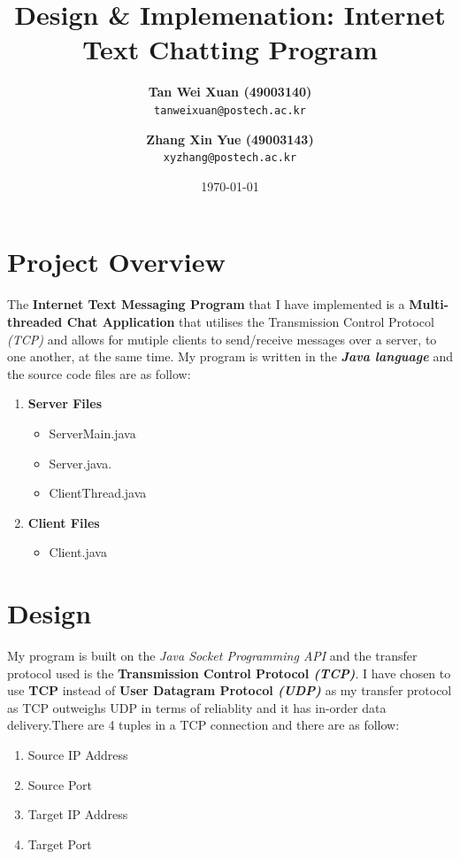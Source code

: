 \documentclass[a4paper,11pt]{article}
\begin{document}
\title{\vspace{-1.0cm}\textbf{Design \& Implemenation: \linebreak Internet Text Chatting Program}}
\author{
  \textbf{Tan Wei Xuan (49003140)}\\
  \texttt{tanweixuan@postech.ac.kr}
  \and
   \textbf{Zhang Xin Yue (49003143)}\\
  \texttt{xyzhang@postech.ac.kr}
}
\date{\today}
\maketitle

\section{Project Overview}
The\textbf{ Internet Text Messaging Program} that I have implemented is a \textbf{Multi-threaded Chat Application} that utilises the Transmission Control Protocol \textit{(TCP)} and allows for mutiple clients to send/receive messages over a server, to one another, at the same time. My program is written in the \textit{\textbf{Java language}} and the source code files are as follow:
\begin{enumerate}
	\item \textbf{Server Files}
\begin{itemize}
  	\item ServerMain.java
 	\item Server.java.
 	\item ClientThread.java
\end{itemize}
	\item \textbf{Client Files}
\begin{itemize}
  	\item Client.java
\end{itemize}
\end{enumerate}

\section{Design}
My program is built on the  \textit{Java Socket Programming API} and the transfer protocol used is the \textbf{Transmission Control Protocol \textit{(TCP)}}.
I have chosen to use \textbf{TCP} instead of \textbf{User Datagram Protocol \textit{(UDP)}} as my transfer protocol as TCP outweighs UDP in terms of reliablity and it has in-order data delivery.There are 4 tuples in a TCP connection and there are as follow:
\begin{enumerate}
  \item Source IP Address
  \item Source Port
  \item Target IP Address
  \item Target Port
\end{enumerate}
\end{document}
